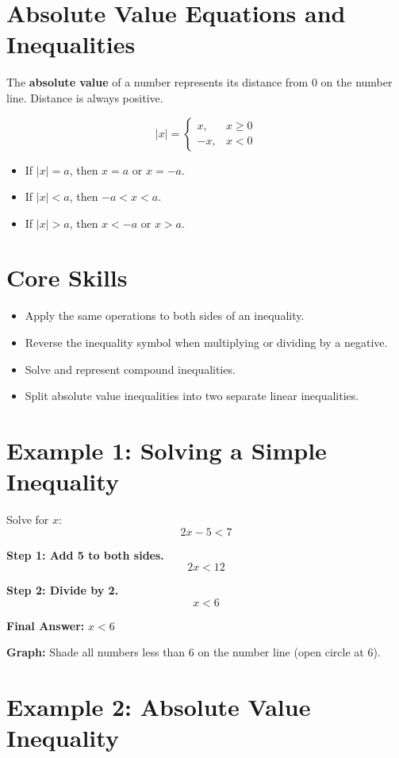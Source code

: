 \documentclass[14pt]{extarticle}
\begin{document}
\section*{Absolute Value Equations and Inequalities}

The \textbf{absolute value} of a number represents its distance from 0 on the number line.  
Distance is always positive.

\[
|x| = 
\begin{cases}
x, & x \ge 0 \\
-x, & x < 0
\end{cases}
\]

\begin{itemize}
    \item If \(|x| = a\), then \(x = a\) or \(x = -a\).
    \item If \(|x| < a\), then \(-a < x < a\).
    \item If \(|x| > a\), then \(x < -a\) or \(x > a\).
\end{itemize}

\section*{Core Skills}
\begin{itemize}
    \item Apply the same operations to both sides of an inequality.
    \item Reverse the inequality symbol when multiplying or dividing by a negative.
    \item Solve and represent compound inequalities.
    \item Split absolute value inequalities into two separate linear inequalities.
\end{itemize}

\section*{Example 1: Solving a Simple Inequality}

Solve for \(x\):
\[
2x - 5 < 7
\]

\textbf{Step 1: Add 5 to both sides.}
\[
2x < 12
\]

\textbf{Step 2: Divide by 2.}
\[
x < 6
\]

\textbf{Final Answer:} \(\boxed{x < 6}\)

\textbf{Graph:} Shade all numbers less than 6 on the number line (open circle at 6).

\section*{Example 2: Absolute Value Inequality}
\end{document}
